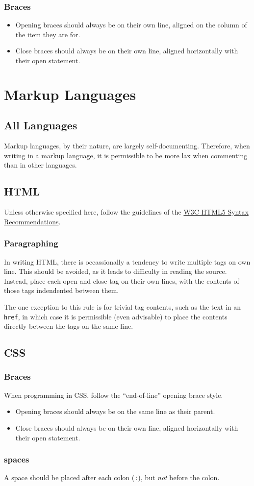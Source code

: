 \documentclass[12pt,letter]{memoir} %
\begin{document}
		\subsection{Braces}
			\begin{itemize}
				\item Opening braces should always be on their own line, aligned
                    on the column of the item they are for.
				\item Close braces should always be on their own line, aligned
                    horizontally with their open statement.
			\end{itemize}

\chapter{Markup Languages}
	\section{All Languages}
        Markup languages, by their nature, are largely self-documenting.
        Therefore, when writing in a markup language, it is permissible to be
        more lax when commenting than in other languages.
	\section{HTML}
		Unless otherwise specified here, follow the guidelines of the
		\href{http://www.w3.org/TR/html5/syntax.html}{W3C HTML5 Syntax Recommendations}.
		\subsection{Paragraphing}
			In writing HTML, there is occassionally a tendency to write multiple
            tags on own line. This should be avoided, as it leads to difficulty
            in reading the source. Instead, place each open and close tag on
            their own lines, with the contents of those tags indendented between
            them.

			The one exception to this rule is for trivial tag contents, such as
            the text in an \texttt{href}, in which case it is permissible (even
            advisable) to place the contents directly between the tags on the
            same line.
	\section{CSS}
		\subsection{Braces}
            When programming in CSS, follow the ``end-of-line'' opening brace
            style.
			\begin{itemize}
				\item Opening braces should always be on the same line as their
                    parent.
				\item Close braces should always be on their own line, aligned
                    horizontally with their open statement.
			\end{itemize}
		\subsection{spaces}
			A space should be placed after each colon (\texttt{:}), but
            \emph{not} before the colon.
\end{document}
